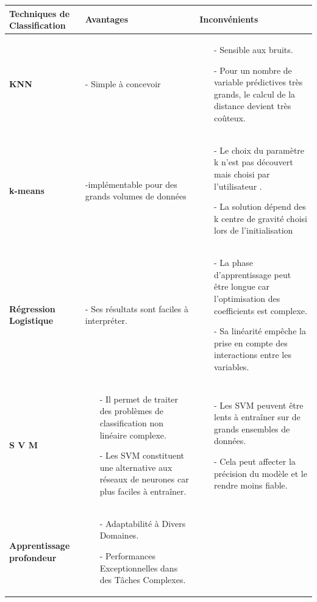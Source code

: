\label{tab:01}
\begin{table}[h]

\begin{tabular}{| m{3cm}| m{6cm}| m{6cm}|}
\hline
 \textbf{Techniques de Classification} & \textbf{Avantages} & \textbf{Inconvénients} \\ 
 \hline
 \textbf{KNN} & - Simple à concevoir &
 \begin{itemize}
 \item[-]Sensible aux bruits.
 \item[-]Pour un nombre de variable prédictives très grands, le calcul de la distance devient très coûteux.
 \end{itemize}
 
 \\  
 \hline
\textbf{ k-means} & -implémentable pour des grands volumes de données & 
 \begin{itemize}
 \item[-]Le choix du paramètre k n’est pas découvert mais choisi par l’utilisateur .
 \item[-] La solution dépend des k centre de gravité choisi lors de l’initialisation
 \end{itemize}
 \\
 \hline
 \textbf{Régression Logistique} & - Ses résultats sont faciles à interpréter. & 
 \begin{itemize}
\item[-] La phase d’apprentissage peut être longue car l’optimisation des coefficients est complexe. 
\item[-]Sa linéarité empêche la prise en compte des interactions entre les variables.
\end{itemize}
 \\
 \hline
 \textbf{S V M} &
 \begin{itemize} 
 \item[-]Il permet de traiter des problèmes de classification non linéaire complexe.
 \item[-]Les SVM constituent une alternative aux réseaux de neurones car plus faciles à entraîner.
 \end{itemize}
 & 
 \begin{itemize} 
 \item[-] Les SVM peuvent être lents à entraîner sur de grands ensembles de données.
 \item[-] Cela peut affecter la précision du modèle et le rendre moins fiable.
 \end{itemize}
 \\
 \hline
 \textbf{Apprentissage profondeur} &
 \begin{itemize}
  \item[-] Adaptabilité à Divers Domaines.
  \item[-] Performances Exceptionnelles dans des Tâches Complexes.
  

\end{itemize}
\end{tabular}
\end{table}
